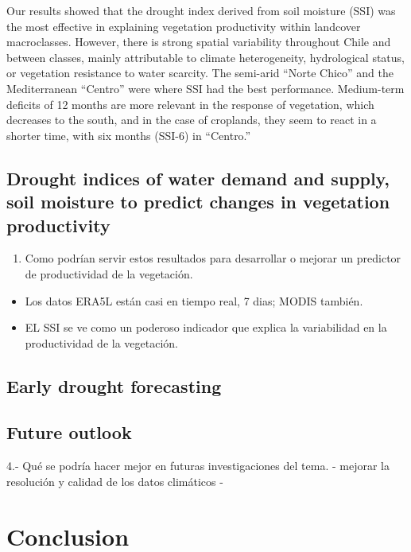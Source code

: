 \documentclass[
  number,
  preprint,
  3p,
  onecolumn]{elsarticle}
\providecommand{\tightlist}{%
  \setlength{\itemsep}{0pt}\setlength{\parskip}{0pt}}\usepackage{longtable,booktabs,array}
\begin{document}
Our results showed that the drought index derived from soil moisture
(SSI) was the most effective in explaining vegetation productivity
within landcover macroclasses. However, there is strong spatial
variability throughout Chile and between classes, mainly attributable to
climate heterogeneity, hydrological status, or vegetation resistance to
water scarcity. The semi-arid ``Norte Chico'' and the Mediterranean
``Centro'' were where SSI had the best performance. Medium-term deficits
of 12 months are more relevant in the response of vegetation, which
decreases to the south, and in the case of croplands, they seem to react
in a shorter time, with six months (SSI-6) in ``Centro.''

\citep{Chatterjee2022}

\hypertarget{drought-indices-of-water-demand-and-supply-soil-moisture-to-predict-changes-in-vegetation-productivity}{%
\subsection{Drought indices of water demand and supply, soil moisture to
predict changes in vegetation
productivity}\label{drought-indices-of-water-demand-and-supply-soil-moisture-to-predict-changes-in-vegetation-productivity}}

\begin{enumerate}
\def\labelenumi{\arabic{enumi}.}
\setcounter{enumi}{2}
\tightlist
\item
  Como podrían servir estos resultados para desarrollar o mejorar un
  predictor de productividad de la vegetación.
\end{enumerate}

\begin{itemize}
\tightlist
\item
  Los datos ERA5L están casi en tiempo real, 7 dias; MODIS también.
\item
  EL SSI se ve como un poderoso indicador que explica la variabilidad en
  la productividad de la vegetación.
\end{itemize}

\hypertarget{early-drought-forecasting}{%
\subsection{Early drought forecasting}\label{early-drought-forecasting}}

\hypertarget{future-outlook}{%
\subsection{Future outlook}\label{future-outlook}}

4.- Qué se podría hacer mejor en futuras investigaciones del tema. -
mejorar la resolución y calidad de los datos climáticos -

\hypertarget{conclusion}{%
\section{Conclusion}\label{conclusion}}

\newpage


\renewcommand\refname{References}
  
\end{document}
